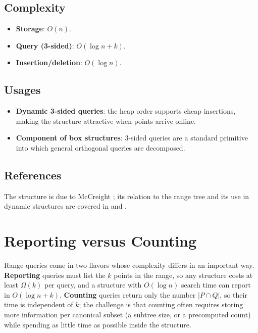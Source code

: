 \subsection{Complexity}

\begin{itemize}
  \item \textbf{Storage}: $O(n)$.
  \item \textbf{Query (3-sided)}: $O(\log n + k)$.
  \item \textbf{Insertion/deletion}: $O(\log n)$.
\end{itemize}

\subsection{Usages}

\begin{itemize}
  \item \textbf{Dynamic 3-sided queries}: the heap order supports cheap
    insertions, making the structure attractive when points arrive online.
  \item \textbf{Component of box structures}: 3-sided queries are a
    standard primitive into which general orthogonal queries are
    decomposed.
\end{itemize}

\subsection{References}

The structure is due to McCreight \cite{mccreight1985}; its relation to
the range tree and its use in dynamic structures are covered in
\cite{berg2008} and \cite{overmars1983}.

\section{Reporting versus Counting}
\label{sec:rangesearch_reporting_counting}

Range queries come in two flavors whose complexity differs in an important
way. \textbf{Reporting} queries must list the $k$ points in the range, so
any structure costs at least $\Omega(k)$ per query, and a structure with
$O(\log n)$ search time can report in $O(\log n + k)$. \textbf{Counting}
queries return only the number $|P \cap Q|$, so their time is independent
of $k$; the challenge is that counting often requires storing more
information per canonical subset (a subtree size, or a precomputed count)
while spending as little time as possible inside the structure.

